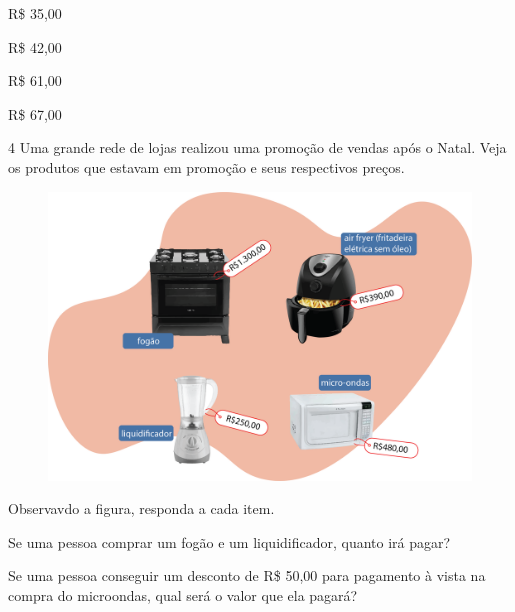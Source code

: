 \begin{minipage}{.5\textwidth}
\begin{escolha}

\item
  R\$ 35,00
\item
  R\$ 42,00
\item
  R\$ 61,00
\item
  R\$ 67,00
\end{escolha}
\end{minipage}

\num{4} Uma grande rede de lojas realizou uma promoção de vendas após o Natal.
Veja os produtos que estavam em promoção e seus respectivos preços.

\begin{figure}[htpb!]
\centering
\includegraphics[width=.73\textwidth]{./media/image67.png}
\end{figure}

Observavdo a figura, responda a cada item.

\begin{escolha}
\item Se uma pessoa comprar um fogão e um liquidificador, quanto irá pagar?

\item Se uma pessoa conseguir um desconto de R\$ 50,00 para pagamento à
  vista na compra do microondas, qual será o valor que ela pagará?
\end{escolha}

